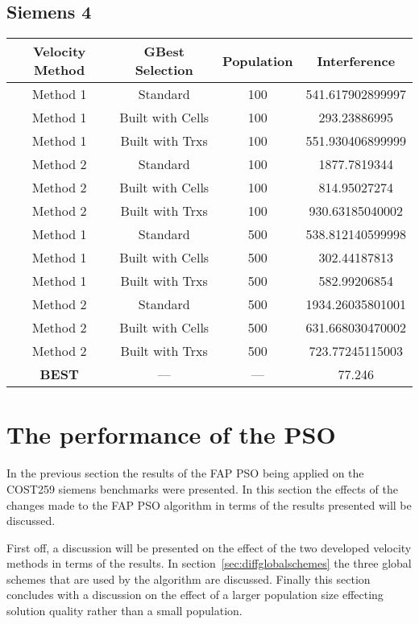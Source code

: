 \subsection{Siemens 4}
\begin{center}
	\begin{tabular}{| c | c | c | c |}
	\hline
	Velocity Method & GBest Selection & Population & Interference\\ \hline
	Method 1 & Standard & 100 & 541.617902899997\\ \hline
	Method 1 & Built with Cells & 100 & 293.23886995\\ \hline
	Method 1 & Built with Trxs & 100 & 551.930406899999\\ \hline
	Method 2 & Standard & 100 & 1877.7819344\\ \hline
	Method 2 & Built with Cells & 100 & 814.95027274\\ \hline
	Method 2 & Built with Trxs & 100 & 930.63185040002\\ \hline
	Method 1 & Standard & 500 & 538.812140599998\\ \hline
	Method 1 & Built with Cells & 500 & 302.44187813\\ \hline
	Method 1 & Built with Trxs & 500 & 582.99206854\\ \hline
	Method 2 & Standard & 500 & 1934.26035801001\\ \hline
	Method 2 & Built with Cells & 500 & 631.668030470002\\ \hline
	Method 2 & Built with Trxs & 500 & 723.77245115003\\ \hline
	\textbf{BEST} & --- & --- & 77.246\\ \hline
	\end{tabular}
\end{center}
\section{The performance of the PSO}
In the previous section the results of the FAP PSO being applied on the COST259 siemens benchmarks were presented. In this section the effects of the changes made to the FAP PSO algorithm in terms of the results presented will be discussed. 

First off, a discussion will be presented on the effect of the two developed velocity methods in terms of the results. In section~\ref{sec:diffglobalschemes} the three global schemes that are used by the algorithm are discussed. Finally this section concludes with a discussion on the effect of a larger population size effecting solution quality rather than a small population.
